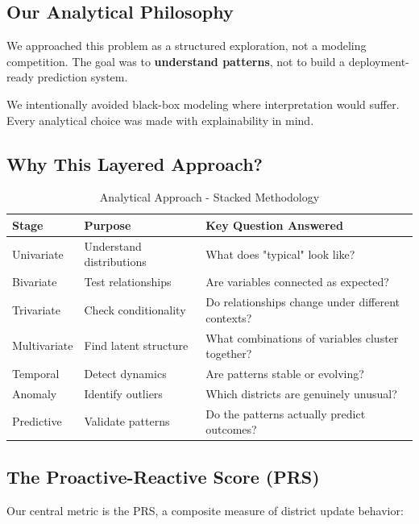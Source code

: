 \documentclass[11pt, a4paper]{article}
\begin{document}
\subsection{Our Analytical Philosophy}

We approached this problem as a structured exploration, not a modeling competition. The goal was to \textbf{understand patterns}, not to build a deployment-ready prediction system.


We intentionally avoided black-box modeling where interpretation would suffer. Every analytical choice was made with explainability in mind.


\subsection{Why This Layered Approach?}

\vspace{0.8em}
\begin{table}[H]
\caption{Analytical Approach - Stacked Methodology}
{\small
\begin{tabularx}{\textwidth}{|Y|Y|Y|}
\hline
\textbf{Stage} & \textbf{Purpose} & \textbf{Key Question Answered} \\ \hline
Univariate & Understand distributions & What does "typical" look like? \\ \hline
Bivariate & Test relationships & Are variables connected as expected? \\ \hline
Trivariate & Check conditionality & Do relationships change under different contexts? \\ \hline
Multivariate & Find latent structure & What combinations of variables cluster together? \\ \hline
Temporal & Detect dynamics & Are patterns stable or evolving? \\ \hline
Anomaly & Identify outliers & Which districts are genuinely unusual? \\ \hline
Predictive & Validate patterns & Do the patterns actually predict outcomes? \\ \hline
\end{tabularx}
}
\end{table}
\vspace{1em}

\subsection{The Proactive-Reactive Score (PRS)}

Our central metric is the PRS, a composite measure of district update behavior:
\end{document}
